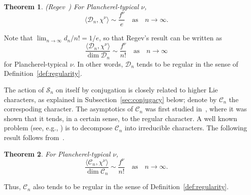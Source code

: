 \documentclass[12pt]%
{amsart}
\renewcommand\S{{\mathcal S}}
\newcommand{\la}{{\lambda}}
\theoremstyle{plain}
\newtheorem{theorem}{Theorem}[section]
\theoremstyle{definition}
\theoremstyle{remark}
\newcommand{\todo}[1]{\vspace{5 mm}\par \noindent
	\marginpar{\textsc{ToDo}} \framebox{\begin{minipage}[c]{0.95
				\textwidth}
			#1 \end{minipage}}\vspace{5 mm}\par}
\begin{document}
\begin{theorem}\label{thm:Regev}{\rm (Regev~\cite{Regev99})}
    For Plancherel-typical $\nu$,  
    \[
        \langle {\mathcal D}_n,\chi^{\nu} \rangle
        \sim \frac{f^{\nu}}{e} 
        \quad \text{as} \quad n\to \infty.
    \]
\end{theorem}

Note that $\lim_{n \to \infty} d_n / n! = 1/e$, so that Regev's result can be written as
\[
    \frac{\langle {\mathcal D}_n,\chi^{\nu} \rangle}{\dim {\mathcal D}_n}
    \sim \frac{f^{\nu}}{n!}
    \quad \text{as} \quad n\to\infty
\]
for Plancherel-typical $\nu$.
In other words, ${\mathcal D}_n$ tends to be regular in the sense of Definition~\ref{def:regularity}.



\medskip

The action of $\S_n$ on itself by conjugation is closely related to higher Lie characters, as explained in Subsection~\ref{sec:conjugacy} below; denote by ${\mathcal C}_n$ the correspoding character.
The asymptotics of ${\mathcal C}_n$
was first studied in~\cite{AF}, where it was shown that it tends, in a certain sense, to the regular character. 
A well known problem (see, e.g., \cite{Heide}) is to decompose 
${\mathcal C}_n$ into irreducible characters. 
The following result follows from~\cite[Theorem 2.1]{R97}. 

\begin{theorem}\label{thm:Roichman}
    For Plancherel-typical $\nu$, 
\[
    \frac{\langle {\mathcal C}_n,\chi^{\nu} \rangle}{\dim {\mathcal C}_n}
    \sim \frac{f^{\nu}}{n!}
    \quad \text{as} \quad n\to\infty.
\]
\end{theorem}
Thus, ${\mathcal C}_n$ also tends to be regular in the sense of Definition~\ref{def:regularity}.
\end{document}
